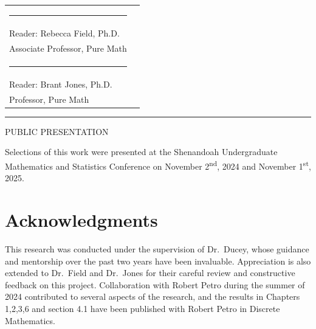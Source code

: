 \documentclass[12pt]{report}
\theoremstyle{definition}
\begin{document}
\begin{titlepage}
\begin{center}
\begin{tabular}{p{2.5in} p{2.5in}}
{\centering\rule{2in}{0.4pt}} & \\
{\scriptsize\raggedright Reader: Rebecca Field, Ph.D.} & \\
{\scriptsize\raggedright Associate Professor, Pure Math} & \\[0.2cm]

{\centering\rule{2in}{0.4pt}} & \\
{\scriptsize\raggedright Reader: Brant Jones, Ph.D.} & \\
{\scriptsize\raggedright Professor, Pure Math}  &
\end{tabular}
\end{center}

\vspace{0.15in}

\noindent\rule{\textwidth}{1.5pt}

{\raggedright\footnotesize\doublespacing PUBLIC PRESENTATION\par}
{\raggedright\footnotesize\doublespacing Selections of this work were presented at the Shenandoah Undergraduate Mathematics and Statistics Conference on November 2\textsuperscript{nd}, 2024 and November 1\textsuperscript{st}, 2025.\par}

\end{titlepage}
\clearpage

\centering\tableofcontents
\thispagestyle{plain}
\clearpage

\doublespacing
\listoffigures
\thispagestyle{plain}
\clearpage

\raggedright
\setlength{\parindent}{2em}


\chapter*{Acknowledgments}
This research was conducted under the supervision of Dr.\ Ducey, whose guidance and mentorship over the past two years have been invaluable. Appreciation is also extended to Dr.\ Field and Dr.\ Jones for their careful review and constructive feedback on this project. Collaboration with Robert Petro during the summer of 2024 contributed to several aspects of the research, and the results in Chapters 1,2,3,6 and section 4.1 have been published with Robert Petro in Discrete Mathematics.
\clearpage
\end{document}
